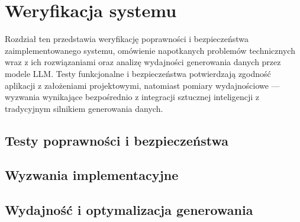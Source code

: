 \chapter{Weryfikacja systemu}
\label{cha:verification}

Rozdział ten przedstawia weryfikację poprawności i bezpieczeństwa zaimplementowanego systemu, omówienie napotkanych problemów technicznych wraz z ich rozwiązaniami oraz analizę wydajności generowania danych przez modele \gls{LLM}. Testy funkcjonalne i bezpieczeństwa potwierdzają zgodność aplikacji z założeniami projektowymi, natomiast pomiary wydajnościowe --- wyzwania wynikające bezpośrednio z integracji sztucznej inteligencji z tradycyjnym silnikiem generowania danych.

\section{Testy poprawności i bezpieczeństwa}


\section{Wyzwania implementacyjne}


\section{Wydajność i optymalizacja generowania}
\label{sec:llm_optimization}

